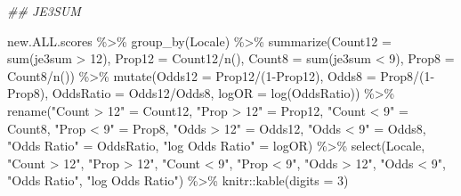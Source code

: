 \documentclass[
  letterpaper,
  DIV=11,
  numbers=noendperiod]{scrartcl}
\newenvironment{Shaded}{\begin{snugshade}}{\end{snugshade}}
\newcommand{\AttributeTok}[1]{\textcolor[rgb]{0.40,0.45,0.13}{#1}}
\newcommand{\DecValTok}[1]{\textcolor[rgb]{0.68,0.00,0.00}{#1}}
\newcommand{\DocumentationTok}[1]{\textcolor[rgb]{0.37,0.37,0.37}{\textit{#1}}}
\newcommand{\FunctionTok}[1]{\textcolor[rgb]{0.28,0.35,0.67}{#1}}
\newcommand{\NormalTok}[1]{\textcolor[rgb]{0.00,0.23,0.31}{#1}}
\newcommand{\OtherTok}[1]{\textcolor[rgb]{0.00,0.23,0.31}{#1}}
\newcommand{\SpecialCharTok}[1]{\textcolor[rgb]{0.37,0.37,0.37}{#1}}
\newcommand{\StringTok}[1]{\textcolor[rgb]{0.13,0.47,0.30}{#1}}
\begin{document}
\begin{Shaded}
\begin{Highlighting}[]
\DocumentationTok{\#\# JE3SUM}

\NormalTok{new.ALL.scores }\SpecialCharTok{\%\textgreater{}\%}
  \FunctionTok{group\_by}\NormalTok{(Locale) }\SpecialCharTok{\%\textgreater{}\%}
  \FunctionTok{summarize}\NormalTok{(}\AttributeTok{Count12 =} \FunctionTok{sum}\NormalTok{(je3sum }\SpecialCharTok{\textgreater{}} \DecValTok{12}\NormalTok{),}
            \AttributeTok{Prop12 =}\NormalTok{ Count12}\SpecialCharTok{/}\FunctionTok{n}\NormalTok{(),}
            \AttributeTok{Count8 =} \FunctionTok{sum}\NormalTok{(je3sum }\SpecialCharTok{\textless{}} \DecValTok{9}\NormalTok{),}
            \AttributeTok{Prop8 =}\NormalTok{ Count8}\SpecialCharTok{/}\FunctionTok{n}\NormalTok{()) }\SpecialCharTok{\%\textgreater{}\%}
  \FunctionTok{mutate}\NormalTok{(}\AttributeTok{Odds12 =}\NormalTok{ Prop12}\SpecialCharTok{/}\NormalTok{(}\DecValTok{1}\SpecialCharTok{{-}}\NormalTok{Prop12),}
         \AttributeTok{Odds8 =}\NormalTok{ Prop8}\SpecialCharTok{/}\NormalTok{(}\DecValTok{1}\SpecialCharTok{{-}}\NormalTok{Prop8),}
         \AttributeTok{OddsRatio =}\NormalTok{ Odds12}\SpecialCharTok{/}\NormalTok{Odds8,}
         \AttributeTok{logOR =} \FunctionTok{log}\NormalTok{(OddsRatio)) }\SpecialCharTok{\%\textgreater{}\%}
  \FunctionTok{rename}\NormalTok{(}\StringTok{"Count \textgreater{} 12"} \OtherTok{=}\NormalTok{ Count12,}
         \StringTok{"Prop \textgreater{} 12"} \OtherTok{=}\NormalTok{ Prop12,}
         \StringTok{"Count \textless{} 9"} \OtherTok{=}\NormalTok{ Count8,}
         \StringTok{"Prop \textless{} 9"} \OtherTok{=}\NormalTok{ Prop8,}
         \StringTok{"Odds \textgreater{} 12"} \OtherTok{=}\NormalTok{ Odds12,}
         \StringTok{"Odds \textless{} 9"} \OtherTok{=}\NormalTok{ Odds8,}
         \StringTok{"Odds Ratio"} \OtherTok{=}\NormalTok{ OddsRatio,}
         \StringTok{"log Odds Ratio"} \OtherTok{=}\NormalTok{ logOR) }\SpecialCharTok{\%\textgreater{}\%}
  \FunctionTok{select}\NormalTok{(Locale, }\StringTok{"Count \textgreater{} 12"}\NormalTok{, }\StringTok{"Prop \textgreater{} 12"}\NormalTok{, }\StringTok{"Count \textless{} 9"}\NormalTok{, }\StringTok{"Prop \textless{} 9"}\NormalTok{, }\StringTok{"Odds \textgreater{} 12"}\NormalTok{, }\StringTok{"Odds \textless{} 9"}\NormalTok{, }\StringTok{"Odds Ratio"}\NormalTok{, }\StringTok{"log Odds Ratio"}\NormalTok{) }\SpecialCharTok{\%\textgreater{}\%}
\NormalTok{  knitr}\SpecialCharTok{::}\FunctionTok{kable}\NormalTok{(}\AttributeTok{digits =} \DecValTok{3}\NormalTok{)}
\end{Highlighting}
\end{Shaded}
\end{document}
